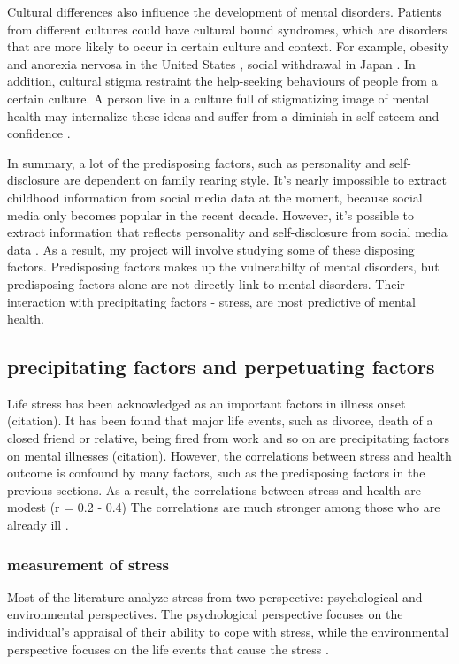 Cultural differences also influence the development of mental disorders. Patients from different cultures could have cultural bound syndromes, which are disorders that are more likely to occur in certain culture and context. For example, obesity and anorexia nervosa in the United States \cite{ritenbaugh1982obesity}, social withdrawal in Japan \cite{teo2010hikikomori}. In addition, cultural stigma restraint the help-seeking behaviours of people from a certain culture. A person live in a culture full of stigmatizing image of mental health may internalize these ideas and suffer from a diminish in self-esteem and confidence \cite{corrigan1998impact,holmes1998individual}. 

In summary, a lot of the predisposing factors, such as personality and self-disclosure are dependent on family rearing style. It's nearly impossible to extract childhood information from social media data at the moment, because social media only becomes popular in the recent decade. However, it's possible to extract information that reflects personality and self-disclosure from social media data \cite{}. As a result, my project will involve studying some of these disposing factors. Predisposing factors makes up the vulnerabilty of mental disorders, but predisposing factors alone are not directly link to mental disorders. Their interaction with precipitating factors - stress, are most predictive of mental health.


\subsection{precipitating factors and perpetuating factors}

Life stress has been acknowledged as an important factors in illness onset (citation). It has been found that major life events, such as divorce, death of a closed friend or relative, being fired from work and so on are precipitating factors on mental illnesses (citation). However, the correlations between stress and health outcome is confound by many factors, such as the predisposing factors in the previous sections. As a result, the correlations between stress and health are modest (r =  0.2 - 0.4)  The correlations are much stronger among those who are already ill \cite{aldwin2004interface}.

\subsubsection{measurement of stress}
Most of the literature analyze stress from two perspective: psychological and environmental perspectives. The psychological perspective focuses on the individual's appraisal of their ability to cope with stress, while the environmental perspective focuses on the life events that cause the stress \cite{mcgrath1970social}. 

